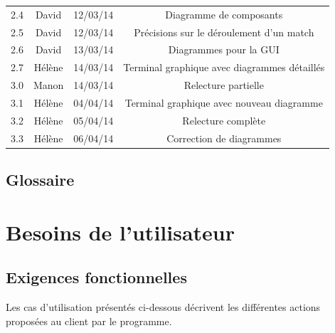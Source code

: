 \documentclass[a4paper,titlepage]{scrreprt}
\begin{document}
\begin{tabular}{|c|c|c|c|}
    2.4 & David & 12/03/14 & Diagramme de composants \\
    2.5 & David & 12/03/14 & Précisions sur le déroulement d'un match \\
    2.6 & David & 13/03/14 & Diagrammes pour la GUI \\
    2.7 & Hélène & 14/03/14 & Terminal graphique avec diagrammes détaillés\\
    3.0 & Manon & 14/03/14 & Relecture partielle \\
    3.1 & Hélène & 04/04/14 & Terminal graphique avec nouveau diagramme\\
    3.2 & Hélène & 05/04/14 & Relecture complète\\
    3.3 & Hélène & 06/04/14 & Correction de diagrammes\\
    \hline
  \end{tabular}


\section{Glossaire}
  \removepagebreak
  \printglossaries
  \restorepagebreak
\chapter{Besoins de l'utilisateur}
  
  
\section{Exigences fonctionnelles}
  
  Les cas d'utilisation présentés ci-dessous décrivent les différentes actions proposées au client par le programme.
\end{document}
